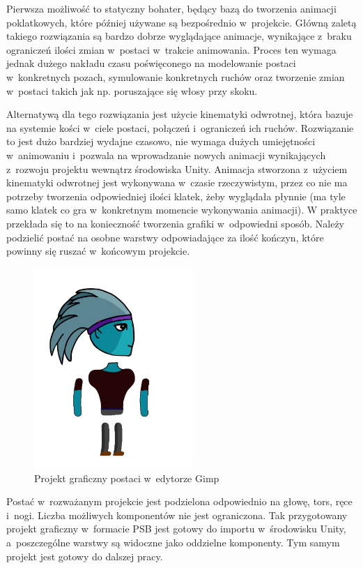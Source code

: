 \documentclass[oneside,polski,logo]{amuthesis}
\begin{document}
Pierwsza możliwość to statyczny bohater, będący bazą do tworzenia animacji poklatkowych, które później używane są bezpośrednio w~projekcie. Główną zaletą takiego rozwiązania są bardzo dobrze wyglądające animacje, wynikające z~braku ograniczeń ilości zmian w~postaci w~trakcie animowania.
Proces ten wymaga jednak dużego nakładu czasu poświęconego na modelowanie postaci w~konkretnych pozach, symulowanie konkretnych ruchów oraz tworzenie zmian w~postaci takich jak np. poruszające się włosy przy skoku.

Alternatywą dla tego rozwiązania jest użycie kinematyki odwrotnej, która bazuje na systemie kości w~ciele postaci, połączeń i~ograniczeń ich ruchów. Rozwiązanie to jest dużo bardziej wydajne czasowo, nie wymaga dużych umiejętności w~animowaniu i~pozwala na wprowadzanie nowych animacji wynikających z~rozwoju projektu wewnątrz środowiska Unity. Animacja stworzona z~użyciem kinematyki odwrotnej jest wykonywana w~czasie rzeczywistym, przez co nie ma potrzeby tworzenia odpowiedniej ilości klatek, żeby wyglądała płynnie (ma tyle samo klatek co gra w~konkretnym momencie wykonywania animacji).
W praktyce przekłada się to na konieczność tworzenia grafiki w~odpowiedni sposób. Należy podzielić postać na osobne warstwy odpowiadające za ilość kończyn, które powinny się ruszać w~końcowym projekcie.\\

\begin{figure}[h]
	\centering
	\includegraphics[width=6cm]{images/kozubal/separatedCharacter.jpg}
	\caption{Projekt graficzny postaci w~edytorze Gimp}
\end{figure}

Postać w~rozważanym projekcie jest podzielona odpowiednio na głowę, tors, ręce i~nogi. Liczba możliwych komponentów nie jest ograniczona. Tak przygotowany projekt graficzny w~formacie PSB jest gotowy do importu w~środowisku Unity, a~poszczególne warstwy są widoczne jako oddzielne komponenty. Tym samym projekt jest gotowy do dalszej pracy.
\end{document}
